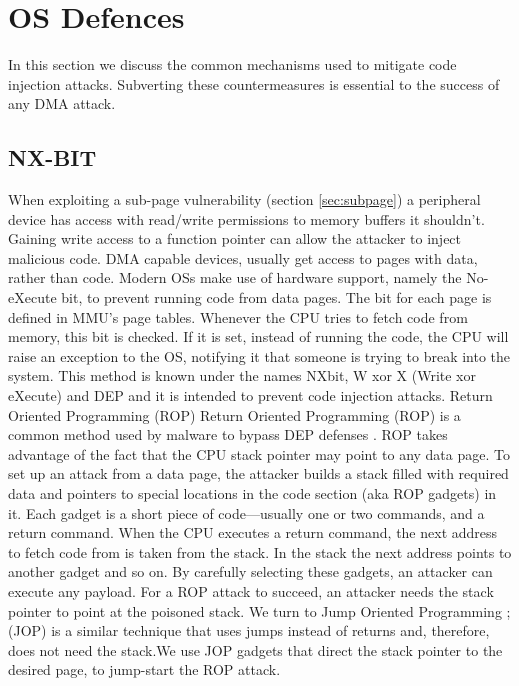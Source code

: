 \section{OS Defences}
In this section we discuss the common mechanisms used to mitigate code injection attacks. Subverting these countermeasures is essential to the success of any DMA attack.

\subsection{NX-BIT}\label{sec:nx-bit}
When exploiting a sub-page vulnerability (section \ref{sec:subpage}) a peripheral device has access with read/write permissions to memory buffers it shouldn't. Gaining write access to a function pointer can allow the attacker to inject malicious code. DMA capable devices, usually get access to pages with data, rather than code. Modern OSs make use of hardware support, namely the No-eXecute bit, to prevent running code from data pages. The bit for each page is defined in MMU’s page tables. Whenever the CPU tries to fetch code from memory, this bit is checked. If it is set, instead of running the code, the CPU will raise an exception to the OS, notifying it that someone is trying to break into the system. This method is known under the names NX\-bit, W xor X (Write xor eXecute) and DEP and it is intended to prevent code injection attacks.\newline
Return Oriented Programming (ROP) Return Oriented Programming (ROP) is a common method used by malware to bypass DEP defenses \cite{RBSS12}. ROP takes advantage of the fact that the CPU stack pointer may point to any data page. To set up an attack from a data page, the attacker builds a stack filled with required data and pointers to special locations in the code section (aka ROP gadgets) in it. Each gadget is a short piece of code—usually one or two commands, and a return command. When the CPU executes a return command, the next address to fetch code from is taken from the stack. In the stack the next address points to another gadget and so on. By carefully selecting these gadgets, an attacker can execute any payload. For a ROP attack to succeed, an attacker needs the stack pointer to point at the poisoned stack. We turn to Jump Oriented Programming ;(JOP) is a similar technique that uses jumps instead of returns and, therefore, does not need the stack\cite{BJFL11}.We use JOP gadgets that direct the stack pointer to the desired page, to jump-start the ROP attack. 

